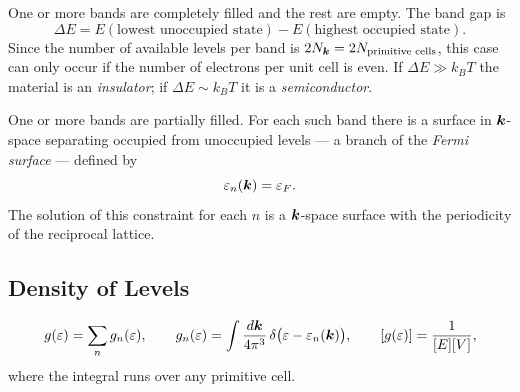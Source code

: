 \begin{definition}
\label{def:bloch-insulator}
One or more bands are completely filled and the rest are empty. The band gap is
\begin{equation}
    \Delta E = E(\text{lowest unoccupied state}) - E(\text{highest occupied state}).
\end{equation}
Since the number of available levels per band is $2N_{\bm{k}} = 2N_{\text{primitive cells}}$, this case can only occur if the number of electrons per unit cell is even. If $\Delta E \gg k_B T$ the material is an \emph{insulator}; if $\Delta E \sim k_B T$ it is a \emph{semiconductor}.
\end{definition}

\begin{definition}
One or more bands are partially filled. For each such band there is a surface in $\bm{k}$-space separating occupied from unoccupied levels --- a branch of the \emph{Fermi surface} --- defined by
\begin{equation}
    \varepsilon_n(\bm{k}) = \varepsilon_F.
\end{equation}
The solution of this constraint for each $n$ is a $\bm{k}$-space surface with the periodicity of the reciprocal lattice.
\end{definition}

\subsection{Density of Levels}

\begin{definition}
\begin{equation}
    g(\varepsilon) = \sum_n g_n(\varepsilon),
    \qquad
    g_n(\varepsilon) = \int \frac{d\bm{k}}{4\pi^3}\,\delta\bigl(\varepsilon - \varepsilon_n(\bm{k})\bigr),
    \qquad [g(\varepsilon)] = \frac{1}{[E][V]},
\end{equation}
where the integral runs over any primitive cell.
\end{definition}

